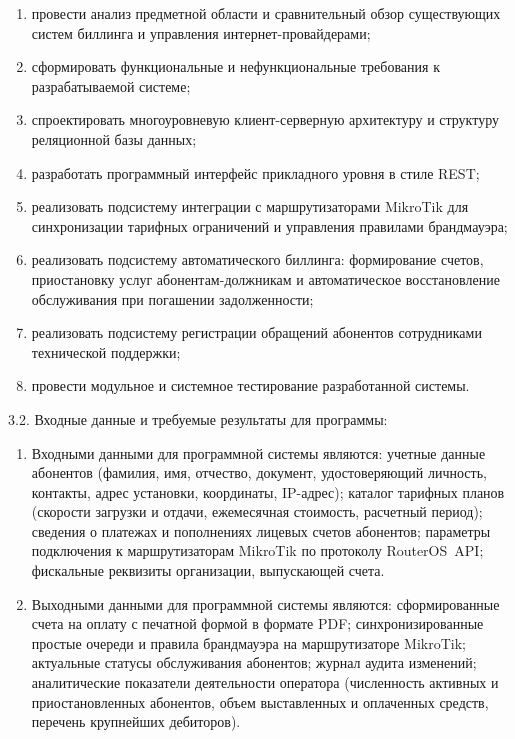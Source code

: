 \begin{enumerate}
\item провести анализ предметной области и сравнительный обзор существующих систем биллинга и управления интернет-провайдерами;
\item сформировать функциональные и нефункциональные требования к разрабатываемой системе;
\item спроектировать многоуровневую клиент-серверную архитектуру и структуру реляционной базы данных;
\item разработать программный интерфейс прикладного уровня в стиле REST;
\item реализовать подсистему интеграции с маршрутизаторами MikroTik для синхронизации тарифных ограничений и управления правилами брандмауэра;
\item реализовать подсистему автоматического биллинга: формирование счетов, приостановку услуг абонентам-должникам и автоматическое восстановление обслуживания при погашении задолженности;
\item реализовать подсистему регистрации обращений абонентов сотрудниками технической поддержки;
\item провести модульное и системное тестирование разработанной системы.
\end{enumerate}

{\parindent0pt
  3.2. Входные данные и требуемые результаты для программы:}

\begin{enumerate}
\item Входными данными для программной системы являются: учетные данные
абонентов (фамилия, имя, отчество, документ, удостоверяющий личность,
контакты, адрес установки, координаты, IP-адрес); каталог тарифных планов
(скорости загрузки и отдачи, ежемесячная стоимость, расчетный период);
сведения о платежах и пополнениях лицевых счетов абонентов; параметры
подключения к маршрутизаторам MikroTik по протоколу RouterOS~API; фискальные
реквизиты организации, выпускающей счета.
\item Выходными данными для программной системы являются: сформированные
счета на оплату с печатной формой в формате PDF; синхронизированные простые
очереди и правила брандмауэра на маршрутизаторе MikroTik; актуальные статусы
обслуживания абонентов; журнал аудита изменений; аналитические показатели
деятельности оператора (численность активных и приостановленных абонентов,
объем выставленных и оплаченных средств, перечень крупнейших дебиторов).
\end{enumerate}

